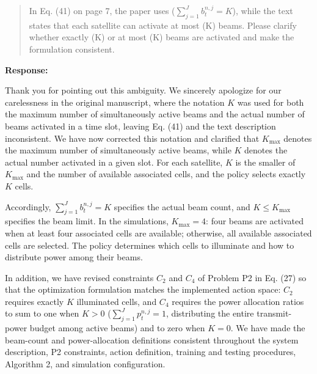 \documentclass[11pt,a4paper]{article}
\begin{document}
\begin{quote}\small In Eq. (41) on page 7, the paper uses ($\sum_{j=1}^{J} b_t^{n,j}=K$), while the text states that each satellite can activate at most (K) beams. Please clarify whether exactly (K) or at most (K) beams are activated and make the formulation consistent.\end{quote}

\textbf{Response:}\par

Thank you for pointing out this ambiguity. We sincerely apologize for our carelessness in the original manuscript, where the notation $K$ was used for both the maximum number of simultaneously active beams and the actual number of beams activated in a time slot, leaving Eq. (41) and the text description inconsistent. We have now corrected this notation and clarified that $K_{\max}$ denotes the maximum number of simultaneously active beams, while $K$ denotes the actual number activated in a given slot. For each satellite, $K$ is the smaller of $K_{\max}$ and the number of available associated cells, and the policy selects exactly $K$ cells.
\par

Accordingly, $\sum_{j=1}^{J}b_t^{n,j}=K$ specifies the actual beam count, and $K\le K_{\max}$ specifies the beam limit. In the simulations, $K_{\max}=4$: four beams are activated when at least four associated cells are available; otherwise, all available associated cells are selected. The policy determines which cells to illuminate and how to distribute power among their beams.
\par

In addition, we have revised constraints $C_2$ and $C_4$ of Problem P2 in Eq. (27) so that the optimization formulation matches the implemented action space: $C_2$ requires exactly $K$ illuminated cells, and $C_4$ requires the power allocation ratios to sum to one when $K>0$ ($\sum_{j=1}^{J}p_t^{n,j}=1$, distributing the entire transmit-power budget among active beams) and to zero when $K=0$. We have made the beam-count and power-allocation definitions consistent throughout the system description, P2 constraints, action definition, training and testing procedures, Algorithm 2, and simulation configuration.
\par

\end{document}
